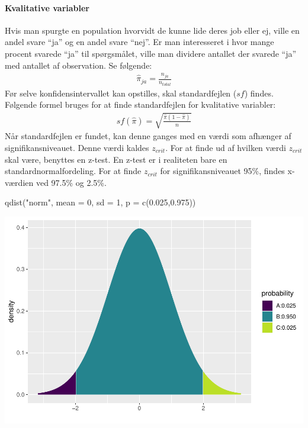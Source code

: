 \documentclass[
]{article}
\newenvironment{Shaded}{\begin{snugshade}}{\end{snugshade}}
\newcommand{\AttributeTok}[1]{\textcolor[rgb]{0.77,0.63,0.00}{#1}}
\newcommand{\DecValTok}[1]{\textcolor[rgb]{0.00,0.00,0.81}{#1}}
\newcommand{\FloatTok}[1]{\textcolor[rgb]{0.00,0.00,0.81}{#1}}
\newcommand{\FunctionTok}[1]{\textcolor[rgb]{0.00,0.00,0.00}{#1}}
\newcommand{\NormalTok}[1]{#1}
\newcommand{\StringTok}[1]{\textcolor[rgb]{0.31,0.60,0.02}{#1}}
\begin{document}
\hypertarget{kvalitative-variabler}{%
\paragraph{Kvalitative variabler}\label{kvalitative-variabler}}

Hvis man spurgte en population hvorvidt de kunne lide deres job eller
ej, ville en andel svare ``ja'' og en andel svare ``nej''. Er man
interesseret i hvor mange procent svarede ``ja'' til spørgsmålet, ville
man dividere antallet der svarede ``ja'' med antallet af observation. Se
følgende: \[
\begin{aligned}
\hat{\pi}_{ja} = \frac{n_{ja}}{n{_{total}}}
\end{aligned}
\] Før selve konfidensintervallet kan opstilles, skal standardfejlen
(\(sf\)) findes. Følgende formel bruges for at finde standardfejlen for
kvalitative variabler: \[
\begin{aligned}
sf(\hat{\pi}) = \sqrt{\frac{\hat{\pi}(1-\hat{\pi})}n{}}
\end{aligned}
\] Når standardfejlen er fundet, kan denne ganges med en værdi som
afhænger af signifikansniveauet. Denne værdi kaldes \(z_{crit}\). For at
finde ud af hvilken værdi \(z_{crit}\) skal være, benyttes en z-test. En
z-test er i realiteten bare en standardnormalfordeling. For at finde
\(z_{crit}\) for signifikansniveauet 95\%, findes x-værdien ved 97.5\%
og 2.5\%.

\begin{Shaded}
\begin{Highlighting}[]
\FunctionTok{qdist}\NormalTok{(}\StringTok{"norm"}\NormalTok{, }\AttributeTok{mean =} \DecValTok{0}\NormalTok{, }\AttributeTok{sd =} \DecValTok{1}\NormalTok{, }\AttributeTok{p =} \FunctionTok{c}\NormalTok{(}\FloatTok{0.025}\NormalTok{,}\FloatTok{0.975}\NormalTok{))}
\end{Highlighting}
\end{Shaded}

\includegraphics{TP2_files/figure-latex/unnamed-chunk-13-1.pdf}
\end{document}
